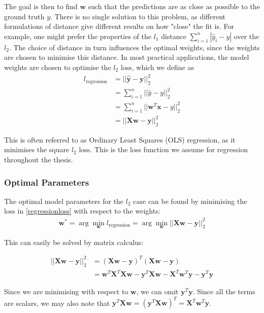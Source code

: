 The goal is then to find $\mathbf{w}$ such that the predictions are as close as possible to the ground truth $y$. There is no single solution to this problem, as different formulations of distance give different results on how "close" the fit is. For example, one might prefer the properties of the $l_1$ distance $\sum_{i=1}^n|\hat{y}_i - y|$ over the $l_2$. The choice of distance in turn influences the optimal weights, since the weights are chosen to minimise this distance. In most practical applications, the model weights are chosen to optimise the $l_2$ loss, which we define as
\begin{align}
    l_{\mathrm{regression}} &= ||\mathbf{\hat{y}} - \mathbf{y}||_2^2 \\
    &= \sum_{i=1}^n  ||\hat{y} - y||_2^2 \\
     &= \sum_{i=1}^n  ||\mathbf{w}^T\mathbf{x} - y||_2^2 \\
    &= ||\mathbf{X}\mathbf{w} - \mathbf{y}||_2^2 
    \label{regressionloss}
\end{align}

This is often referred to as Ordinary Least Squares (OLS) regression, as it minimises the square $l_2$ loss. This is the loss function we assume for regression throughout the thesis.


\subsubsection{Optimal Parameters}
The optimal model parameters for the $l_2$ case can be found by minimising the loss in \ref{regressionloss} with respect to the weights: 
\begin{align}
    \mathbf{w}^* = \arg \min_{\mathbf{w}}l_{\mathrm{regression}} = \arg \min_{\mathbf{w}} ||\mathbf{X}\mathbf{w} - \mathbf{y}||_2^2 
\end{align}

This can easily be solved by matrix calculus:
 
 \begin{align*}
     ||\mathbf{X}\mathbf{w} - \mathbf{y}||_2^2  &= (\mathbf{X}\mathbf{w} - \mathbf{y})^T(\mathbf{X}\mathbf{w} - \mathbf{y}) \\
     &= \mathbf{w}^T\mathbf{X}^T \mathbf{X}\mathbf{w} - \mathbf{y}^T\mathbf{X}\mathbf{w} - \mathbf{X}^T\mathbf{w}^T\mathbf{y} - \mathbf{y}^T\mathbf{y}
 \end{align*}
 
 Since we are minimising with respect to $\mathbf{w}$, we can omit $\mathbf{y}^T\mathbf{y}$. Since all the terms are scalars, we may also note that $\mathbf{y}^T\mathbf{X}\mathbf{w} = (\mathbf{y}^T\mathbf{X}\mathbf{w})^T = 
 \mathbf{X}^T\mathbf{w}^T\mathbf{y} $. 
 
